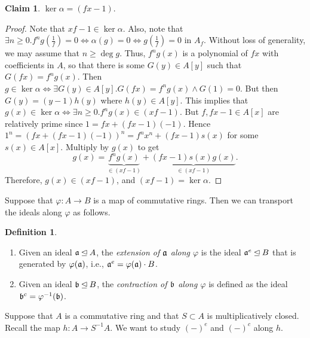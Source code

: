 \documentclass[10pt,letterpaper,cm]{nupset}
\theoremstyle{definition}
\newtheorem{definition}{Definition}[subsection]
\theoremstyle{theorem}
\newtheorem*{claim}{Claim}
\theoremstyle{remark}
\newcommand{\1}{\mathbf{1}}
\newcommand{\0}{\vec 0}
\begin{document}
\begin{claim}
$\ker{\alpha} = (fx-1)$.
\end{claim}
\begin{proof}
Note that $xf-1\in \ker{\alpha}$. Also, note that  $ \exists n\geq 0. f^ng\left(\frac{1}{f}\right)=0 \iff  \alpha(g) = 0 \iff  g\left(\frac{1}{f}\right) = 0$ in $A_f$. Without loss of generality, we may assume that $n\geq \deg{g}$. Thus, $f^ng(x)$ is a polynomial of $fx$ with coefficients in $A$, so that there is some $G(y) \in A[y]$ such that $G(fx) = f^ng(x)$. Then $g\in \ker{\alpha} \iff \exists G(y) \in A[y]. G(fx) = f^ng(x) \land G(1) =0$. But then $G(y) = (y-1)h(y)$ where $h(y) \in A[y]$. This implies that $g(x) \in \ker{\alpha} \iff \exists n\geq 0 . f^ng(x) \in (xf -1)$. But $f, fx-1 \in A[x]$ are relatively prime since $1= fx + (fx-1)(-1)$.  Hence $1^n = (fx + (fx-1)(-1))^n = f^n x^n + (fx-1)s(x)$ for some $s(x) \in A[x]$. Multiply by $g(x)$ to get $$  g(x) = \underbrace{f^ng(x)}_{\in (xf-1)} + \underbrace{(fx -1)s(x)g(x)}_{\in (xf-1)}  .$$ Therefore, $g(x) \in (xf-1)$, and $(xf-1)=  \ker{\alpha}$. 
\end{proof}

Suppose that $\varphi : A \to B$ is a map of commutative rings. Then we can transport the ideals along $\varphi$ as follows. 

\begin{definition} $ $
\begin{enumerate}
\item
Given an ideal $\frak{a} \unlhd A$, the \textit{extension of $\frak{a}$ along $\varphi$} is the ideal $\frak{a}^e \unlhd B$ that is generated by $\varphi(\frak{a})$, i.e., $\frak{a}^e = \varphi(\frak{a}) \cdot B$.  
\item Given an ideal $\frak{b} \unlhd B$, the \textit{contraction of $\frak{b}$ along $\varphi$} is defined as the ideal $\frak{b}^c = \varphi^{-1}(\frak{b})$. 
\end{enumerate}
\end{definition}

Suppose that $A$ is a commutative ring and that $S\subset A$ is multiplicatively closed. Recall the map $h: A \to S^{-1}A$. We want to study $(-)^e$ and $(-)^c$ along $h$. 
\end{document}
